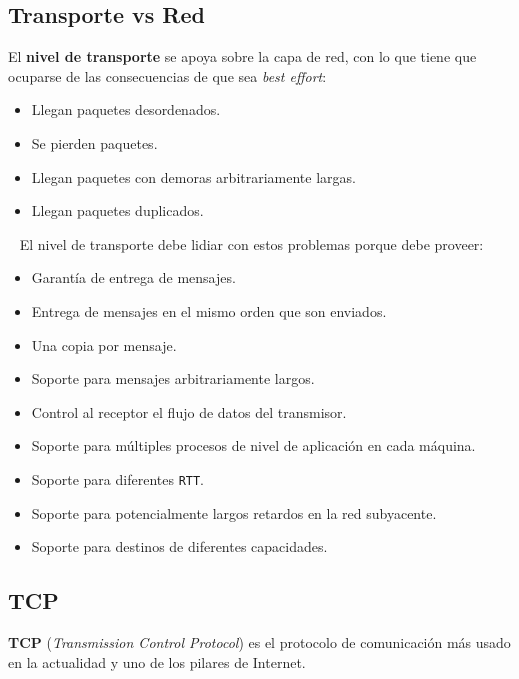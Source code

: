 \documentclass[]{article}
\begin{document}
\subsection{Transporte vs Red}

El \textbf{nivel de transporte} se apoya sobre la capa de red, con lo que tiene que ocuparse de las consecuencias de que sea \emph{best effort}:
\begin{itemize}
    \item Llegan paquetes desordenados.
    \item Se pierden paquetes.
    \item Llegan paquetes con demoras arbitrariamente largas.
    \item Llegan paquetes duplicados.
\end{itemize}

~\newline
El nivel de transporte debe lidiar con estos problemas porque debe proveer:
\begin{itemize}
    \item Garantía de entrega de mensajes.
    \item Entrega de mensajes en el mismo orden que son enviados.
    \item Una copia por mensaje.
    \item Soporte para mensajes arbitrariamente largos.
    \item Control al receptor el flujo de datos del transmisor.
    \item Soporte para múltiples procesos de nivel de aplicación en cada máquina.
    \item Soporte para diferentes \texttt{RTT}.
    \item Soporte para potencialmente largos retardos en la red subyacente.
    \item Soporte para destinos de diferentes capacidades.
\end{itemize}

\subsection{TCP}
\textbf{TCP} (\emph{Transmission Control Protocol}) es el protocolo de comunicación más usado en la actualidad y uno de los pilares de Internet.
\end{document}
